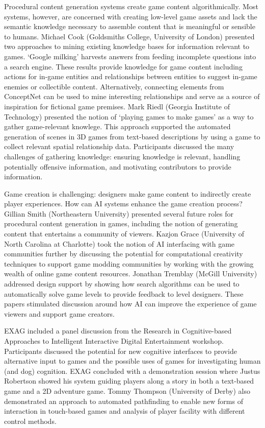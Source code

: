 \documentclass[10pt,a4paper]{article}
\begin{document}
Procedural content generation systems create game content algorithmically.
Most systems, however, are concerned with creating low-level game assets and lack the semantic knowledge necessary to assemble content that is meaningful or sensible to humans.
Michael Cook (Goldsmiths College, University of London) presented two approaches to mining existing knowledge bases for information relevant to games.
`Google milking' harvests answers from feeding incomplete questions into a search engine.
These results provide knowledge for game content including actions for in-game entities and relationships between entities to suggest in-game enemies or collectible content.
Alternatively, connecting elements from ConceptNet can be used to mine interesting relationships and serve as a source of inspiration for fictional game premises.
Mark Riedl (Georgia Institute of Technology) presented the notion of `playing games to make games' as a way to gather game-relevant knowlege.
This approach supported the automated generation of scenes in 3D games from text-based descriptions by using a game to collect relevant spatial relationship data.
Participants discussed the many challenges of gathering knowledge: ensuring knowledge is relevant, handling potentially offensive information, and motivating contributors to provide information.


Game creation is challenging: designers make game content to indirectly create player experiences.
How can AI systems enhance the game creation process?
Gillian Smith (Northeastern University) presented several future roles for procedural content generation in games, including the notion of generating content that entertains a community of viewers.
Kazjon Grace (University of North Carolina at Charlotte) took the notion of AI interfacing with game communities further by discussing the potential for computational creativity techniques to support game modding communities by working with the growing wealth of online game content resources.
Jonathan Tremblay (McGill University) addressed design support by showing how search algorithms can be used to automatically solve game levels to provide feedback to level designers.
These papers stimulated discussion around how AI can improve the experience of game viewers and support game creators.


EXAG included a panel discussion from the Research in Cognitive-based Approaches to Intelligent Interactive Digital Entertainment workshop.
Participants discussed the potential for new cognitive interfaces to provide alternative input to games and the possible uses of games for investigating human (and dog) cognition.
EXAG concluded with a demonstration session where Justus Robertson showed his system guiding players along a story in both a text-based game and a 2D adventure game.
Tommy Thompson (University of Derby) also demonstrated an approach to automated pathfinding to enable new forms of interaction in touch-based games and analysis of player facility with different control methods.
\end{document}
